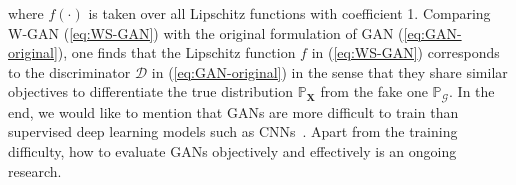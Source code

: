 where $f(\cdot)$ is taken over all Lipschitz functions with coefficient 1.
Comparing W-GAN (\ref{eq:WS-GAN}) with the original formulation of GAN (\ref{eq:GAN-original}), one finds
that the Lipschitz function $f$ in (\ref{eq:WS-GAN}) corresponds
to the discriminator $\mathcal{D}$ in (\ref{eq:GAN-original}) in the sense that they
share similar objectives to differentiate the true distribution
$\mathbb{P}_{\bm{X}}$ from the fake one $\mathbb{P}_{\mathcal{G}}$. In the end, we would like to mention that GANs are more difficult to train than supervised deep learning models such as CNNs~\citep{salimans2016improved}. Apart from the training difficulty, how to evaluate GANs objectively and effectively is an ongoing research.

